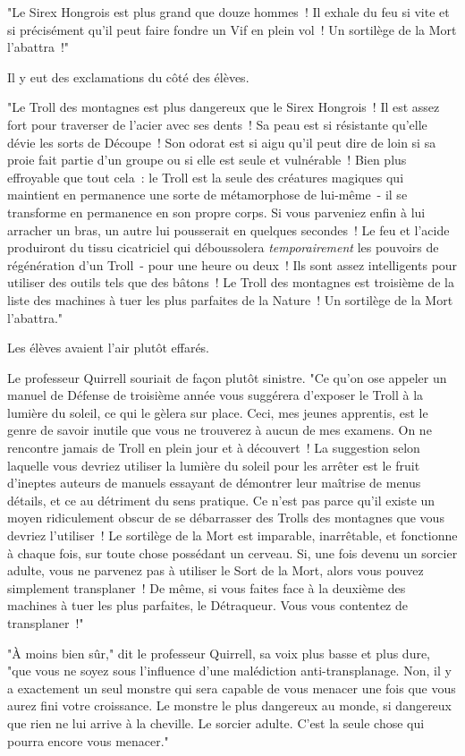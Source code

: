 "Le Sirex Hongrois est plus grand que douze hommes~! Il exhale du feu si vite et si précisément qu'il peut faire fondre un Vif en plein vol~! Un sortilège de la Mort l'abattra~!"

Il y eut des exclamations du côté des élèves.

"Le Troll des montagnes est plus dangereux que le Sirex Hongrois~! Il est assez fort pour traverser de l'acier avec ses dents~! Sa peau est si résistante qu'elle dévie les sorts de Découpe~! Son odorat est si aigu qu'il peut dire de loin si sa proie fait partie d'un groupe ou si elle est seule et vulnérable~! Bien plus effroyable que tout cela~: le Troll est la seule des créatures magiques qui maintient en permanence une sorte de métamorphose de lui-même~- il se transforme en permanence en son propre corps. Si vous parveniez enfin à lui arracher un bras, un autre lui pousserait en quelques secondes~! Le feu et l'acide produiront du tissu cicatriciel qui déboussolera \emph{temporairement} les pouvoirs de régénération d'un Troll~- pour une heure ou deux~! Ils sont assez intelligents pour utiliser des outils tels que des bâtons~! Le Troll des montagnes est troisième de la liste des machines à tuer les plus parfaites de la Nature~! Un sortilège de la Mort l'abattra."

Les élèves avaient l'air plutôt effarés.

Le professeur Quirrell souriait de façon plutôt sinistre. "Ce qu'on ose appeler un manuel de Défense de troisième année vous suggérera d'exposer le Troll à la lumière du soleil, ce qui le gèlera sur place. Ceci, mes jeunes apprentis, est le genre de savoir inutile que vous ne trouverez à aucun de mes examens. On ne rencontre jamais de Troll en plein jour et à découvert~! La suggestion selon laquelle vous devriez utiliser la lumière du soleil pour les arrêter est le fruit d'ineptes auteurs de manuels essayant de démontrer leur maîtrise de menus détails, et ce au détriment du sens pratique. Ce n'est pas parce qu'il existe un moyen ridiculement obscur de se débarrasser des Trolls des montagnes que vous devriez l'utiliser~! Le sortilège de la Mort est imparable, inarrêtable, et fonctionne à chaque fois, sur toute chose possédant un cerveau. Si, une fois devenu un sorcier adulte, vous ne parvenez pas à utiliser le Sort de la Mort, alors vous pouvez simplement transplaner~! De même, si vous faites face à la deuxième des machines à tuer les plus parfaites, le Détraqueur. Vous vous contentez de transplaner~!"

"À moins bien sûr," dit le professeur Quirrell, sa voix plus basse et plus dure, "que vous ne soyez sous l'influence d'une malédiction anti-transplanage. Non, il y a exactement un seul monstre qui sera capable de vous menacer une fois que vous aurez fini votre croissance. Le monstre le plus dangereux au monde, si dangereux que rien ne lui arrive à la cheville. Le sorcier adulte. C'est la seule chose qui pourra encore vous menacer."

